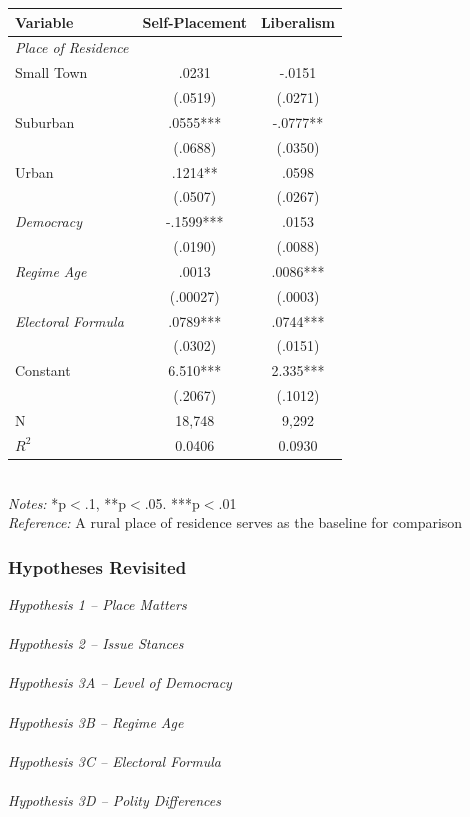 \documentclass[20pt]{beamer}
\newcommand\e{\emph}
\newcommand\tb{\textbf}
\begin{document}
\begin{frame}
\tiny
\begin{table}[h!]
	\begin{tabulary}{\linewidth}{l c c}
		\\
		\hline
		\tb{Variable}&\tb{Self-Placement}&\tb{Liberalism} \\
		\hline
		\e{Place of Residence} & & \\
		Small Town &.0231&-.0151 \\
		&(.0519)&(.0271) \\
		Suburban& .0555***& -.0777** \\
		&(.0688)& (.0350) \\
		Urban&.1214** & .0598 \\
		&(.0507) & (.0267) \\
		\e{Democracy}& -.1599*** & .0153\\
		&(.0190) & (.0088)\\
		\e{Regime Age} & .0013 & .0086***\\
		&(.00027) & (.0003)\\
		\e{Electoral Formula}&.0789*** & .0744***\\
		&(.0302) & (.0151) \\
		\hline
		Constant& 6.510*** & 2.335*** \\
		&(.2067) & (.1012)\\
		N&18,748 & 9,292 \\
		$R^2$&0.0406& 0.0930 \\
		\hline
	\end{tabulary}
	\\
	\e{Notes:} *p$<$.1, **p$<$.05. ***p$<$.01 \\
	\e{Reference:} A rural place of residence serves as the baseline for comparison
\end{table}
\end{frame}

\begin{frame}
\footnotesize
\frametitle{Hypotheses Revisited}

\e {Hypothesis 1 -- Place Matters} \\
~~\\
\e{Hypothesis 2 -- Issue Stances} \\
~~\\
\e{Hypothesis 3A -- Level of Democracy} \\
~~\\
\e{Hypothesis 3B -- Regime Age} \\
~~\\
\e{Hypothesis 3C -- Electoral Formula}\\
~~\\
\e{Hypothesis 3D -- Polity Differences} 

\end{frame}
\end{document}
